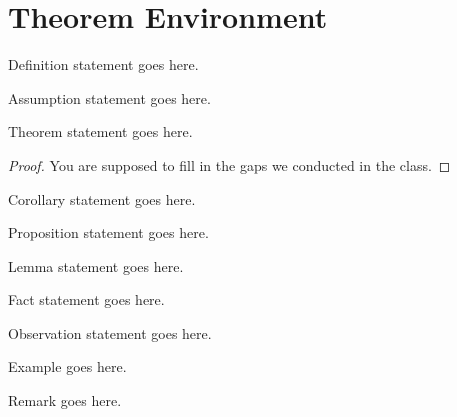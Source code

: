 \documentclass{article}
\begin{document}

\section{Theorem Environment} 
\begin{definition}
    Definition statement goes here.
    \label{def:label}
\end{definition}

\begin{assumption}
    Assumption statement goes here.
    \label{assum:label}
\end{assumption}

\begin{theorem}
    Theorem statement goes here.
    \label{thm:label}
\end{theorem}

\begin{proof}
    You are supposed to fill in the gaps we conducted in the class.
\end{proof}

\begin{corollary}
    Corollary statement goes here.
    \label{cor:label}
\end{corollary}

\begin{proposition}
    Proposition statement goes here.
    \label{prop:label}
\end{proposition}

\begin{lemma}
    Lemma statement goes here.
    \label{lem:label}
\end{lemma}

\begin{fact}
    Fact statement goes here.
    \label{fact:label}
\end{fact}

\begin{observation}
    Observation statement goes here.
    \label{obs:label}
\end{observation}

\begin{example}
    Example goes here.
    \label{ex:label}
\end{example}

\begin{remark}
    Remark goes here.
    \label{ex:remark}
\end{remark}
\end{document}
